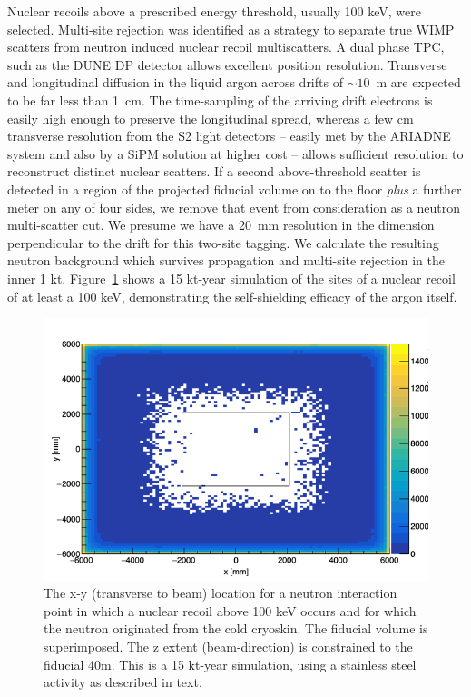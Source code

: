 \documentclass[a4paper,11pt]{article}
\begin{document}
Nuclear recoils above a prescribed energy threshold, usually 100 keV, were selected. Multi-site rejection was identified as a strategy to separate true WIMP scatters from neutron induced nuclear recoil multiscatters. A dual phase TPC, such as the DUNE DP detector allows excellent position resolution. Transverse and longitudinal diffusion in the liquid argon across drifts of $\sim10$~m are expected to be far less than 1~cm. The time-sampling of the arriving drift electrons is easily high enough to preserve the longitudinal spread, whereas a few cm transverse resolution from the S2 light detectors -- easily met by the ARIADNE system and also by a SiPM solution at higher cost -- allows sufficient resolution to reconstruct distinct nuclear scatters. If a second above-threshold scatter is detected in a region of the projected fiducial volume on to the floor {\it plus} a further meter on any of four sides, we remove that event from consideration as a neutron multi-scatter cut. We presume we have a 20~mm resolution in the dimension perpendicular to the drift for this two-site tagging. We calculate the resulting neutron background which survives propagation and multi-site rejection in the inner 1 kt. Figure~\ref{fig:neutrons_xy} shows a 15 kt-year simulation of the sites of a nuclear recoil of at least a 100 keV, demonstrating the self-shielding efficacy of the argon itself.%

\begin{figure}[ht]
\begin{centering}
\includegraphics[width=0.90\columnwidth]{Figures/neutrons_xy.png}
\end{centering}

\caption{The x-y (transverse to beam) location for a neutron interaction point in which a nuclear recoil above 100 keV occurs and for which the neutron originated from the cold cryoskin. The fiducial volume is superimposed. The z extent (beam-direction) is constrained to the fiducial 40m. This is a 15 kt-year simulation, using a stainless steel activity as described in text. }
\label{fig:neutrons_xy}
\end{figure}
\end{document}

